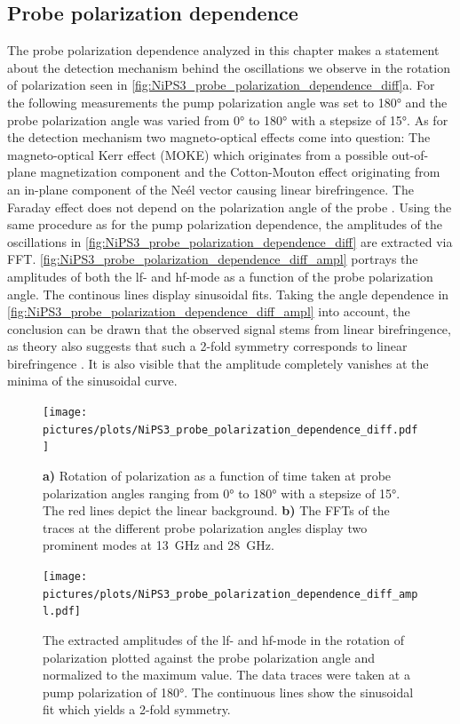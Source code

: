 \subsection{Probe polarization dependence}
The probe polarization dependence analyzed in this chapter makes a statement about the detection mechanism behind the oscillations we observe in the rotation of polarization seen in \autoref{fig:NiPS3_probe_polarization_dependence_diff}a.
For the following measurements the pump polarization angle was set to 180° and the probe polarization angle was varied from 0° to 180° with a stepsize of 15°.
As for the detection mechanism two magneto-optical effects come into question:
The magneto-optical Kerr effect (MOKE) which originates from a possible out-of-plane magnetization component and the Cotton-Mouton effect originating from an in-plane component of the Neél vector causing linear birefringence.
The Faraday effect does not depend on the polarization angle of the probe \cite{toyoda_phase_2023}.
Using the same procedure as for the pump polarization dependence, the amplitudes of the oscillations in \autoref{fig:NiPS3_probe_polarization_dependence_diff} are extracted via FFT.
\autoref{fig:NiPS3_probe_polarization_dependence_diff_ampl} portrays the amplitudes of both the lf- and hf-mode as a function of the probe polarization angle.
The continous lines display sinusoidal fits.
Taking the angle dependence in \autoref{fig:NiPS3_probe_polarization_dependence_diff_ampl} into account, the conclusion can be drawn that the observed signal stems from linear birefringence, as theory also suggests that such a 2-fold symmetry corresponds to linear birefringence \cite{satoh_excitation_2017}.
It is also visible that the amplitude completely vanishes at the minima of the sinusoidal curve.
\begin{figure}[hbt!]
    \centering
    \texttt{[image: pictures/plots/NiPS3\_probe\_polarization\_dependence\_diff.pdf]} \vspace{-0.3cm}
    \caption{\textbf{a)} Rotation of polarization as a function of time taken at probe polarization angles ranging from 0° to 180° with a stepsize of 15°. The red lines depict the linear background. \textbf{b)} The FFTs of the traces at the different probe polarization angles display two prominent modes at \qty{13}{GHz} and \qty{28}{GHz}.}
    \label{fig:NiPS3_probe_polarization_dependence_diff}
\end{figure}
\begin{figure}[hbt!]
    \centering  
    \texttt{[image: pictures/plots/NiPS3\_probe\_polarization\_dependence\_diff\_ampl.pdf]} \vspace{-0.3cm}
    \caption{The extracted amplitudes of the lf- and hf-mode in the rotation of polarization plotted against the probe polarization angle and normalized to the maximum value. The data traces were taken at a pump polarization of 180°. The continuous lines show the sinusoidal fit which yields a 2-fold symmetry.}
    \label{fig:NiPS3_probe_polarization_dependence_diff_ampl}
\end{figure}
